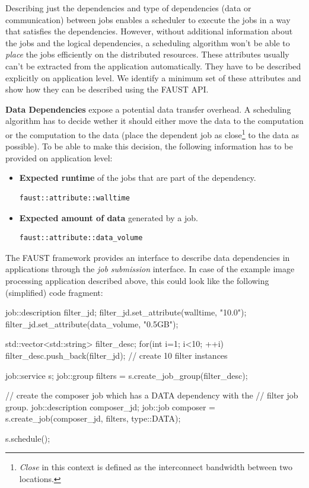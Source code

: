 Describing just the dependencies and type of dependencies (data or communication) between jobs enables a scheduler to execute the 
jobs in a way that satisfies the dependencies. However, without additional information about the jobs and the logical dependencies, a scheduling algorithm won't be able to \textit{place} the jobs efficiently on the distributed resources. These attributes usually can't be extracted from the application automatically. They have to be described explicitly on application level. We identify a minimum set of these attributes and show how they can be described using the FAUST API.

\textbf{Data Dependencies} expose a potential data transfer overhead. A scheduling algorithm has to decide wether it should either move the data to the computation or the computation to the data (place the dependent job as close\footnote{\textit{Close} in this context is defined as the interconnect bandwidth between two locations.} to the data as possible). To be able to make this decision, the following information has to be provided on application level:

\begin{itemize}
\item \textbf{Expected runtime} of the jobs that are part of the dependency. \begin{verbatim}faust::attribute::walltime\end{verbatim}
\item \textbf{Expected amount of data} generated by a job.
\begin{verbatim}faust::attribute::data_volume\end{verbatim}
\end{itemize}

The FAUST framework provides an interface to describe data dependencies in applications through the \textit{job submission} interface. In case of the example image processing application described above, this could look like the following (simplified) code fragment:

 \begin{mycode}[label=Describing Data Dependencies]
 
    job::description filter_jd;
    filter_jd.set_attribute(walltime, "10.0");
    filter_jd.set_attribute(data_volume, "0.5GB");
    
    std::vector<std::string> filter_desc;
    for(int i=1; i<10; ++i)
      filter_desc.push_back(filter_jd); // create 10 filter instances
    
    job::service s;
    job::group filters = s.create_job_group(filter_desc);

    // create the composer job which has a DATA dependency with the
    // filter job group. 
    job::description composer_jd;
    job::job composer = s.create_job(composer_jd, filters, type::DATA);
    
    s.schedule();
  
 \end{mycode}

